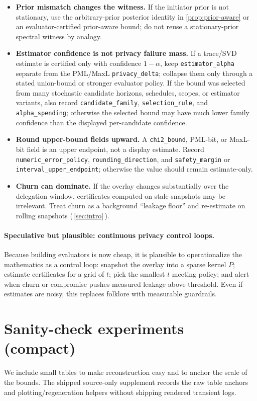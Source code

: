 \documentclass[11pt]{article}
\begin{document}
\begin{itemize}[leftmargin=1.2em]
\item \textbf{Prior mismatch changes the witness.} If the initiator prior is not stationary, use the arbitrary-prior posterior identity in \cref{prop:prior-aware}
or an evaluator-certified prior-aware bound; do not reuse a stationary-prior spectral witness by analogy.
\item \textbf{Estimator confidence is not privacy failure mass.} If a trace/SVD estimate is certified only with confidence $1-\alpha$, keep \texttt{estimator\_alpha} separate from the PML/MaxL \texttt{privacy\_delta}; collapse them only through a stated union-bound or stronger evaluator policy.  If the bound was selected from many stochastic candidate horizons, schedules, scopes, or estimator variants, also record \nolinkurl{candidate_family}, \nolinkurl{selection_rule}, and \nolinkurl{alpha_spending}; otherwise the selected bound may have much lower family confidence than the displayed per-candidate confidence.
\item \textbf{Round upper-bound fields upward.} A \texttt{chi2\_bound}, PML-bit, or MaxL-bit field is an upper endpoint, not a display estimate.  Record \nolinkurl{numeric_error_policy}, \nolinkurl{rounding_direction}, and \nolinkurl{safety_margin} or \nolinkurl{interval_upper_endpoint}; otherwise the value should remain estimate-only.
\item \textbf{Churn can dominate.} If the overlay changes substantially over the delegation window,
certificates computed on stale snapshots may be irrelevant. Treat churn as a background ``leakage floor'' and
re-estimate on rolling snapshots (\,\cref{sec:intro}\,).
\end{itemize}

\paragraph{Speculative but plausible: continuous privacy control loops.}
Because building evaluators is now cheap, it is plausible to operationalize the mathematics as a control loop:
snapshot the overlay into a sparse kernel $P$; estimate certificates for a grid of $t$; pick the smallest $t$
meeting policy; and alert when churn or compromise pushes measured leakage above threshold.
Even if estimates are noisy, this replaces folklore with measurable guardrails.


\section{Sanity-check experiments (compact)}\label{sec:experiments}
We include small tables to make reconstruction easy and to anchor the scale
of the bounds. The shipped source-only supplement records the raw table anchors
and plotting/regeneration helpers without shipping rendered transient logs.
\end{document}
